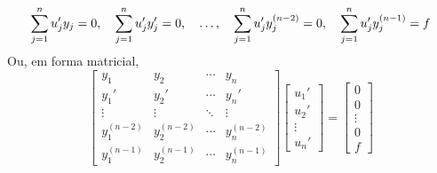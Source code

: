 \documentclass[12pt,a4paper,oneside]{memoir}
\begin{document}
\begin{equation}
\label{mvpn-sist}
  \sum_{j=1}^{n} u_j' y_j = 0 \text,\quad
  \sum_{j=1}^{n} u_j' y_j' = 0 \text,\quad
  \ldots\text,\quad
  \sum_{j=1}^{n} u_j' y^{(n-2)}_j = 0 \text,\quad
  \sum_{j=1}^{n} u_j' y^{(n-1)}_j = f
\end{equation}
Ou, em forma matricial,
\begin{equation}
\label{mvpn-sistm}
  \begin{bmatrix}
    y_1 & y_2 & \cdots & y_n \\
    y_1' & y_2' & \cdots & y_n' \\
    \vdots & \vdots & \ddots & \vdots \\
    y_1^{(n-2)} & y_2^{(n-2)} & \cdots & y_n^{(n-2)} \\
    y_1^{(n-1)} & y_2^{(n-1)} & \cdots & y_n^{(n-1)}
  \end{bmatrix}
  \begin{bmatrix}
    u_1' \\ u_2' \\ \vdots \\ u_n'
  \end{bmatrix}
  =
  \begin{bmatrix}
    0 \\ 0 \\ \vdots \\ 0 \\ f
  \end{bmatrix}
\end{equation}
\end{document}
